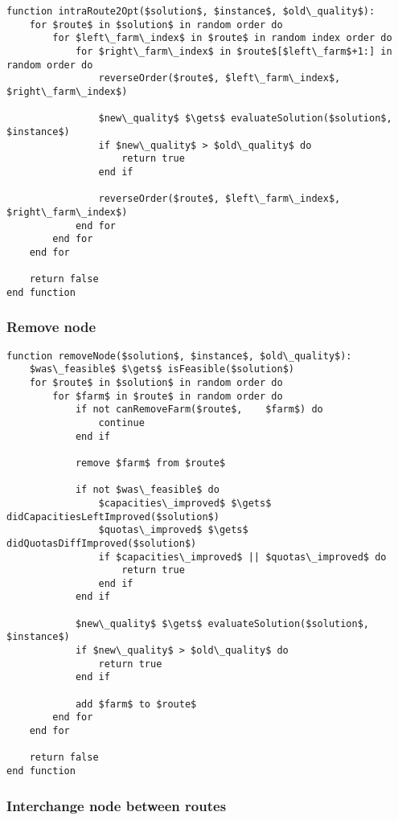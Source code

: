 \begin{lstlisting}[style=estiloPseudocodigo]
function intraRoute2Opt($solution$, $instance$, $old\_quality$):
    for $route$ in $solution$ in random order do
        for $left\_farm\_index$ in $route$ in random index order do
            for $right\_farm\_index$ in $route$[$left\_farm$+1:] in random order do
                reverseOrder($route$, $left\_farm\_index$, $right\_farm\_index$)

                $new\_quality$ $\gets$ evaluateSolution($solution$, $instance$)
                if $new\_quality$ > $old\_quality$ do
                    return true
                end if

                reverseOrder($route$, $left\_farm\_index$, $right\_farm\_index$)
            end for
        end for
    end for

    return false
end function
\end{lstlisting}

\subsubsection{Remove node}

\begin{lstlisting}[style=estiloPseudocodigo]
function removeNode($solution$, $instance$, $old\_quality$):
    $was\_feasible$ $\gets$ isFeasible($solution$)
    for $route$ in $solution$ in random order do
        for $farm$ in $route$ in random order do
            if not canRemoveFarm($route$,    $farm$) do
                continue
            end if

            remove $farm$ from $route$

            if not $was\_feasible$ do
                $capacities\_improved$ $\gets$ didCapacitiesLeftImproved($solution$)
                $quotas\_improved$ $\gets$ didQuotasDiffImproved($solution$)
                if $capacities\_improved$ || $quotas\_improved$ do
                    return true
                end if
            end if

            $new\_quality$ $\gets$ evaluateSolution($solution$, $instance$)
            if $new\_quality$ > $old\_quality$ do
                return true
            end if

            add $farm$ to $route$
        end for
    end for

    return false
end function
\end{lstlisting}

\subsubsection{Interchange node between routes}


